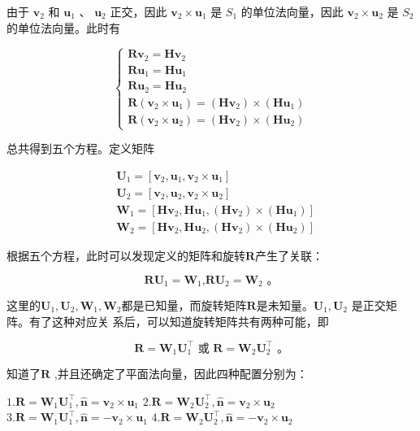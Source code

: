 \documentclass{article}
\begin{document}
由于 $\mathbf{v}_{2}$ 和 $\mathbf{u}_{1}$ 、 $\mathbf{u}_{2}$ 正交，因此 $\mathbf{v}_{2}\times\mathbf{u}_{1}$ 是 $S_{1}$ 的单位法向量，因此 $\mathbf{v}_{2}\times\mathbf{u}_{2}$ 是 $S_{2}$ 的单位法向量。此时有

$$\left.\left\{\begin{array}{l}\mathbf{R}\mathbf{v}_2=\mathbf{H}\mathbf{v}_2\\\mathbf{R}\mathbf{u}_1=\mathbf{H}\mathbf{u}_1\\\mathbf{R}\mathbf{u}_2=\mathbf{H}\mathbf{u}_2\\\mathbf{R}(\mathbf{v}_2\times\mathbf{u}_1)=(\mathbf{H}\mathbf{v}_2)\times(\mathbf{H}\mathbf{u}_1)\\\mathbf{R}(\mathbf{v}_2\times\mathbf{u}_2)=(\mathbf{H}\mathbf{v}_2)\times(\mathbf{H}\mathbf{u}_2)\end{array}\right.\right.$$

总共得到五个方程。定义矩阵

$$\begin{aligned}&\mathbf{U}_1=[\mathbf{v}_2,\mathbf{u}_1,\mathbf{v}_2\times\mathbf{u}_1]\\&\mathbf{U}_2=[\mathbf{v}_2,\mathbf{u}_2,\mathbf{v}_2\times\mathbf{u}_2]\\&\mathbf{W}_1=[\mathbf{H}\mathbf{v}_2,\mathbf{H}\mathbf{u}_1,(\mathbf{H}\mathbf{v}_2)\times(\mathbf{H}\mathbf{u}_1)]\\&\mathbf{W}_2=[\mathbf{H}\mathbf{v}_2,\mathbf{H}\mathbf{u}_2,(\mathbf{H}\mathbf{v}_2)\times(\mathbf{H}\mathbf{u}_2)]\end{aligned}$$

根据五个方程，此时可以发现定义的矩阵和旋转$\mathbf{R}$产生了关联：

$$\mathbf{RU}_1=\mathbf{W}_1\text{,}\mathbf{RU}_2=\mathbf{W}_2\text{ 。}$$

这里的$\mathbf{U}_1,\mathbf{U}_2,\mathbf{W}_1,\mathbf{W}_2$都是已知量，而旋转矩阵$\mathbf{R}$是未知量。$\mathbf{U}_1,\mathbf{U}_2$ 是正交矩阵。有了这种对应关
系后，可以知道旋转矩阵共有两种可能，即

$$\mathbf{R}=\mathbf{W}_1\mathbf{U}_1^\top\text{ 或 }\mathbf{R}=\mathbf{W}_2\mathbf{U}_2^\top\text{ 。}$$

知道了$\mathbf{R}$ ,并且还确定了平面法向量，因此四种配置分别为：

$1.\mathbf{R}=\mathbf{W}_{1}\mathbf{U}_{1}^{\top},\hat{\mathbf{n}}=\mathbf{v}_{2}\times\mathbf{u}_{1}$ $2.\mathbf{R}=\mathbf{W}_{2}\mathbf{U}_{2}^{\top},\hat{\mathbf{n}}=\mathbf{v}_{2}\times\mathbf{u}_{2}$ $3.\mathbf{R}=\mathbf{W}_{1}\mathbf{U}_{1}^{\top},\hat{\mathbf{n}}=-\mathbf{v}_{2}\times\mathbf{u}_{1}$ $4.\mathbf{R}=\mathbf{W}_{2}\mathbf{U}_{2}^{\top},\hat{\mathbf{n}}=-\mathbf{v}_{2}\times\mathbf{u}_{2}$
\end{document}
